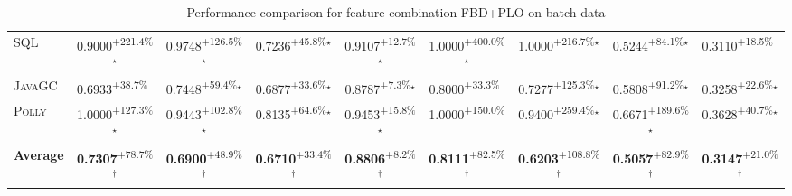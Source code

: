 \begin{table}[htbp]
\begin{tabular}{l|cccc|cccc}
\textsc{SQL} & \cellcolor{green!30}0.9000\textsuperscript{+221.4\%}$^\star$ & \cellcolor{green!30}0.9748\textsuperscript{+126.5\%}$^\star$ & \cellcolor{green!30}0.7236\textsuperscript{+45.8\%}$^\star$ & \cellcolor{green!30}0.9107\textsuperscript{+12.7\%}$^\star$ & \cellcolor{green!30}1.0000\textsuperscript{+400.0\%}$^\star$ & \cellcolor{green!30}1.0000\textsuperscript{+216.7\%}$^\star$ & \cellcolor{green!30}0.5244\textsuperscript{+84.1\%}$^\star$ & \cellcolor{green!30}0.3110\textsuperscript{+18.5\%}$^{\,\,\,}$ \\
\textsc{JavaGC} & \cellcolor{green!30}0.6933\textsuperscript{+38.7\%}$^{\,\,\,}$ & \cellcolor{green!30}0.7448\textsuperscript{+59.4\%}$^\star$ & \cellcolor{green!30}0.6877\textsuperscript{+33.6\%}$^\star$ & \cellcolor{green!30}0.8787\textsuperscript{+7.3\%}$^\star$ & \cellcolor{green!30}0.8000\textsuperscript{+33.3\%}$^{\,\,\,}$ & \cellcolor{green!30}0.7277\textsuperscript{+125.3\%}$^\star$ & \cellcolor{green!30}0.5808\textsuperscript{+91.2\%}$^\star$ & \cellcolor{green!30}0.3258\textsuperscript{+22.6\%}$^\star$ \\
\textsc{Polly} & \cellcolor{green!30}1.0000\textsuperscript{+127.3\%}$^\star$ & \cellcolor{green!30}0.9443\textsuperscript{+102.8\%}$^\star$ & \cellcolor{green!30}0.8135\textsuperscript{+64.6\%}$^\star$ & \cellcolor{green!30}0.9453\textsuperscript{+15.8\%}$^\star$ & \cellcolor{green!30}1.0000\textsuperscript{+150.0\%}$^{\,\,\,}$ & \cellcolor{green!30}0.9400\textsuperscript{+259.4\%}$^\star$ & \cellcolor{green!30}0.6671\textsuperscript{+189.6\%}$^\star$ & \cellcolor{green!30}0.3628\textsuperscript{+40.7\%}$^\star$ \\
\hline
\textbf{Average} & \cellcolor{green!30}\textbf{0.7307}\textsuperscript{+78.7\%}$^\dagger$ & \cellcolor{green!30}\textbf{0.6900}\textsuperscript{+48.9\%}$^\dagger$ & \cellcolor{green!30}\textbf{0.6710}\textsuperscript{+33.4\%}$^\dagger$ & \cellcolor{green!30}\textbf{0.8806}\textsuperscript{+8.2\%}$^\dagger$ & \cellcolor{green!30}\textbf{0.8111}\textsuperscript{+82.5\%}$^\dagger$ & \cellcolor{green!30}\textbf{0.6203}\textsuperscript{+108.8\%}$^\dagger$ & \cellcolor{green!30}\textbf{0.5057}\textsuperscript{+82.9\%}$^\dagger$ & \cellcolor{green!30}\textbf{0.3147}\textsuperscript{+21.0\%}$^\dagger$ \\
\hline
\end{tabular}
\caption{Performance comparison for feature combination FBD+PLO on batch data}
\label{tab:combo_FBD_PLO_performance_batch}
\end{table}